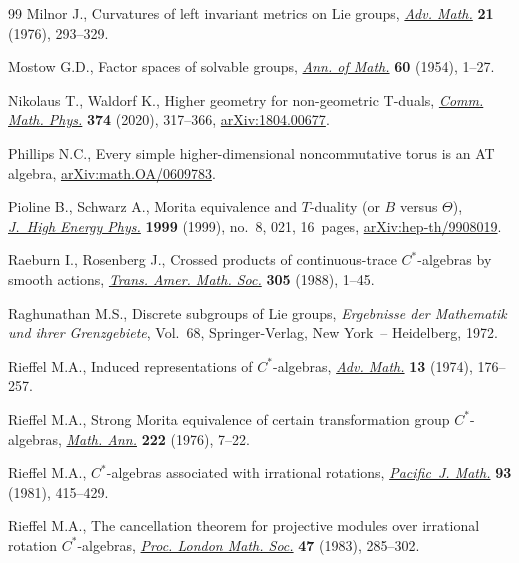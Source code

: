 \documentclass[pdftex]{sigma}
\numberwithin{equation}{section}
\begin{document}
\begin{thebibliography}{99}
Milnor J., Curvatures of left invariant metrics on {L}ie groups, \href{https://doi.org/10.1016/S0001-8708(76)80002-3}{\textit{Adv.
 Math.}} \textbf{21} (1976), 293--329.

Mostow G.D., Factor spaces of solvable groups, \href{https://doi.org/10.2307/1969700}{\textit{Ann. of Math.}}
 \textbf{60} (1954), 1--27.

Nikolaus T., Waldorf K., Higher geometry for non-geometric {T}-duals,
 \href{https://doi.org/10.1007/s00220-019-03496-3}{\textit{Comm. Math. Phys.}} \textbf{374} (2020), 317--366,
 \href{https://arxiv.org/abs/1804.00677}{arXiv:1804.00677}.

Phillips N.C., Every simple higher-dimensional noncommutative torus is an AT
 algebra, \href{https://arxiv.org/abs/math.OA/0609783}{arXiv:math.OA/0609783}.

Pioline B., Schwarz A., Morita equivalence and {$T$}-duality (or {$B$} versus
 {$\Theta$}), \href{https://doi.org/10.1088/1126-6708/1999/08/021}{\textit{J.~High Energy Phys.}} \textbf{1999} (1999), no.~8, 021,
 16~pages, \href{https://arxiv.org/abs/hep-th/9908019}{arXiv:hep-th/9908019}.

Raeburn I., Rosenberg J., Crossed products of continuous-trace
 {$C^\ast$}-algebras by smooth actions, \href{https://doi.org/10.2307/2001039}{\textit{Trans. Amer. Math. Soc.}}
 \textbf{305} (1988), 1--45.

Raghunathan M.S., Discrete subgroups of {L}ie groups, \textit{Ergebnisse der
 Mathematik und ihrer Grenzgebiete}, Vol.~68, Springer-Verlag, New York~--
 Heidelberg, 1972.

Rieffel M.A., Induced representations of {$C^{\ast}$}-algebras, \href{https://doi.org/10.1016/0001-8708(74)90068-1}{\textit{Adv.
 Math.}} \textbf{13} (1974), 176--257.

Rieffel M.A., Strong {M}orita equivalence of certain transformation group
 {$C^*$}-algebras, \href{https://doi.org/10.1007/BF01418238}{\textit{Math. Ann.}} \textbf{222} (1976), 7--22.

Rieffel M.A., {$C^{\ast} $}-algebras associated with irrational rotations,
 \href{https://doi.org/10.2140/pjm.1981.93.415}{\textit{Pacific~J. Math.}} \textbf{93} (1981), 415--429.

Rieffel M.A., The cancellation theorem for projective modules over irrational
 rotation {$C^{\ast} $}-algebras, \href{https://doi.org/10.1112/plms/s3-47.2.285}{\textit{Proc. London Math. Soc.}} \textbf{47}
 (1983), 285--302.


\end{thebibliography}
\end{document}
